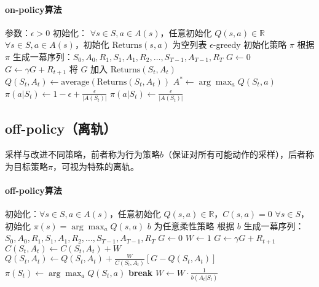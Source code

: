 \documentclass[
12pt, %
a4paper, 
oneside, %
headinclude,footinclude, %
]{scrartcl}
\begin{document}
\paragraph{on-policy算法}
\begin{myalgorithm}
\State 参数：$\epsilon > 0$
\State 初始化：
\State \quad $\forall s \in S, a \in A(s)$，任意初始化 $Q(s,a) \in \mathbb{R}$
\State \quad $\forall s \in S, a \in A(s)$，初始化 $\text{Returns}(s,a)$ 为空列表
\State \quad $\epsilon$-greedy 初始化策略 $\pi$
\Loop
    \State 根据 $\pi$ 生成一幕序列：$S_0,A_0,R_1,S_1,A_1,R_2,\dots,S_{T-1},A_{T-1},R_T$
    \State $G \gets 0$
        \State $G \gets \gamma G + R_{t+1}$
            \State 将 $G$ 加入 $\text{Returns}(S_t,A_t)$
            \State $Q(S_t,A_t) \gets \text{average}(\text{Returns}(S_t,A_t))$
            \State $A^* \gets \arg\max_a Q(S_t,a)$
                    \State $\pi(a|S_t) \gets 1-\epsilon+\frac{\epsilon}{|A(S_t)|}$
                \Else
                    \State $\pi(a|S_t) \gets \frac{\epsilon}{|A(S_t)|}$
                \EndIf
            \EndFor
        \EndIf
    \EndFor
\EndLoop
\end{myalgorithm}
\subsection{off-policy（离轨）}
采样与改进不同策略，前者称为行为策略$ b $（保证对所有可能动作的采样），后者称为目标策略$ \pi $，可视为特殊的离轨。
\paragraph{off-policy算法}
\begin{myalgorithm}
\State 初始化：$\forall s \in S, a \in A(s)$，任意初始化 $Q(s,a) \in \mathbb{R}$，$C(s,a) = 0$
\State $\forall s \in S$，初始化 $\pi(s) = \arg\max_a Q(s,a)$ 
\Loop
    \State $b$ 为任意柔性策略 
    \State 根据 $b$ 生成一幕序列：$S_0,A_0,R_1,S_1,A_1,R_2,\dots,S_{T-1},A_{T-1},R_T$
    \State $G \gets 0$
    \State $W \gets 1$
        \State $G \gets \gamma G + R_{t+1}$
        \State $C(S_t,A_t) \gets C(S_t,A_t) + W$
        \State $Q(S_t,A_t) \gets Q(S_t,A_t) + \frac{W}{C(S_t,A_t)}[G - Q(S_t,A_t)]$
        \State $\pi(S_t) \gets \arg\max_a Q(S_t,a)$
            \State \textbf{break} 
        \EndIf
        \State $W \gets W \cdot \frac{1}{b(A_t|S_t)}$ 
    \EndFor
\EndLoop
\end{myalgorithm}
\end{document}
